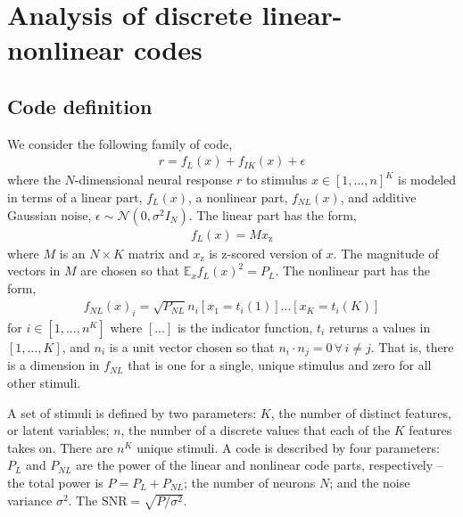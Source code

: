 \documentclass[letter,12pt]{article}
\newcommand{\E}{\mathbb{E}}
\begin{document}
\captionsetup[figure]{labelfont=bf,textfont=normalfont,
  singlelinecheck=off,justification=raggedright,font=footnotesize}
\setlength{\extrarowheight}{5pt}


\section{Analysis of discrete linear-nonlinear codes}

\subsection{Code definition}
We consider the following family of code,
\begin{align}
  r = f_{L}(x) + f_{IK}(x) + \epsilon
\end{align}
where the $N$-dimensional neural response $r$ to stimulus $x \in [1, ..., n]^{K}$
is modeled in terms of a linear part, $f_{L}(x)$, a nonlinear part, $f_{NL}(x)$,
and additive Gaussian noise, $\epsilon \sim \mathcal{N}(0, \sigma^{2} I_{N})$.
The linear part has the form, 
\begin{align}
  f_{L}(x) = M x_{\textrm{z}}
\end{align}
where $M$ is an $N \times K$ matrix and $x_{\textrm{z}}$ is z-scored version of
$x$. The magnitude of vectors in $M$ are chosen so that
$\E_{x} f_{L}(x)^{2} = P_{L}$.
The nonlinear part has the form,
\begin{align}
  f_{NL}(x)_{i} = \sqrt{P_{NL}} n_{i} [x_{1} = t_{i}(1)] ... [x_{K} = t_{i}(K)]
\end{align}
for $i \in [1, ..., n^{K}]$ where $[...]$ is the indicator function,
$t_{i}$ returns a values in $[1, ..., K]$, and $n_{i}$ is a unit vector chosen
so that $n_{i} \cdot n_{j} = 0 \, \forall \, i \ne j$. That is, there is a dimension in
$f_{NL}$ that is one for a single, unique stimulus and zero for all other stimuli.

A set of stimuli is defined by two parameters: $K$, the number of distinct
features, or latent variables; $n$, the number of a discrete values that each of
the $K$ features takes on. There are $n^{K}$ unique stimuli. A code is described
by four parameters: $P_{L}$ and $P_{NL}$ are the power of the linear and
nonlinear code parts, respectively -- the total power is $P = P_{L} + P_{NL}$;
the number of neurons $N$; and the noise variance $\sigma^{2}$. The
$\textrm{SNR} = \sqrt{P/\sigma^{2}}$. 
\end{document}
